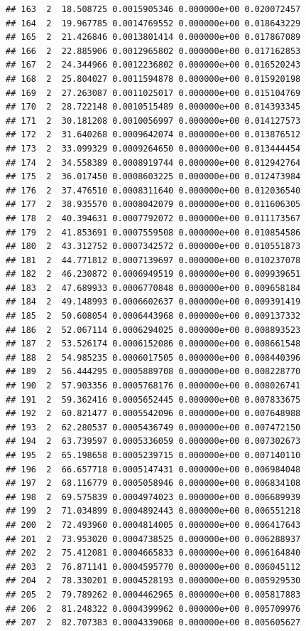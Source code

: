 \documentclass[article]{jss}\usepackage[]{graphicx}\usepackage[]{xcolor}
\makeatletter
\newenvironment{kframe}{%
 \def\at@end@of@kframe{}%
 \ifinner\ifhmode%
  \def\at@end@of@kframe{\end{minipage}}%
  \begin{minipage}{\columnwidth}%
 \fi\fi%
 \def\FrameCommand##1{\hskip\@totalleftmargin \hskip-\fboxsep
 \colorbox{shadecolor}{##1}\hskip-\fboxsep
     \hskip-\linewidth \hskip-\@totalleftmargin \hskip\columnwidth}%
 \MakeFramed {\advance\hsize-\width
   \@totalleftmargin\z@ \linewidth\hsize
   \@setminipage}}%
 {\par\unskip\endMakeFramed%
 \at@end@of@kframe}
\newenvironment{knitrout}{}{} %
\makeatother
\begin{document}
\begin{knitrout}
\begin{kframe}
\begin{verbatim}
## 163  2  18.508725 0.0015905346 0.000000e+00 0.020072457
## 164  2  19.967785 0.0014769552 0.000000e+00 0.018643229
## 165  2  21.426846 0.0013801414 0.000000e+00 0.017867089
## 166  2  22.885906 0.0012965802 0.000000e+00 0.017162853
## 167  2  24.344966 0.0012236802 0.000000e+00 0.016520243
## 168  2  25.804027 0.0011594878 0.000000e+00 0.015920198
## 169  2  27.263087 0.0011025017 0.000000e+00 0.015104769
## 170  2  28.722148 0.0010515489 0.000000e+00 0.014393345
## 171  2  30.181208 0.0010056997 0.000000e+00 0.014127573
## 172  2  31.640268 0.0009642074 0.000000e+00 0.013876512
## 173  2  33.099329 0.0009264650 0.000000e+00 0.013444454
## 174  2  34.558389 0.0008919744 0.000000e+00 0.012942764
## 175  2  36.017450 0.0008603225 0.000000e+00 0.012473984
## 176  2  37.476510 0.0008311640 0.000000e+00 0.012036540
## 177  2  38.935570 0.0008042079 0.000000e+00 0.011606305
## 178  2  40.394631 0.0007792072 0.000000e+00 0.011173567
## 179  2  41.853691 0.0007559508 0.000000e+00 0.010854586
## 180  2  43.312752 0.0007342572 0.000000e+00 0.010551873
## 181  2  44.771812 0.0007139697 0.000000e+00 0.010237078
## 182  2  46.230872 0.0006949519 0.000000e+00 0.009939651
## 183  2  47.689933 0.0006770848 0.000000e+00 0.009658184
## 184  2  49.148993 0.0006602637 0.000000e+00 0.009391419
## 185  2  50.608054 0.0006443968 0.000000e+00 0.009137332
## 186  2  52.067114 0.0006294025 0.000000e+00 0.008893523
## 187  2  53.526174 0.0006152086 0.000000e+00 0.008661548
## 188  2  54.985235 0.0006017505 0.000000e+00 0.008440396
## 189  2  56.444295 0.0005889708 0.000000e+00 0.008228770
## 190  2  57.903356 0.0005768176 0.000000e+00 0.008026741
## 191  2  59.362416 0.0005652445 0.000000e+00 0.007833675
## 192  2  60.821477 0.0005542096 0.000000e+00 0.007648988
## 193  2  62.280537 0.0005436749 0.000000e+00 0.007472150
## 194  2  63.739597 0.0005336059 0.000000e+00 0.007302673
## 195  2  65.198658 0.0005239715 0.000000e+00 0.007140110
## 196  2  66.657718 0.0005147431 0.000000e+00 0.006984048
## 197  2  68.116779 0.0005058946 0.000000e+00 0.006834108
## 198  2  69.575839 0.0004974023 0.000000e+00 0.006689939
## 199  2  71.034899 0.0004892443 0.000000e+00 0.006551218
## 200  2  72.493960 0.0004814005 0.000000e+00 0.006417643
## 201  2  73.953020 0.0004738525 0.000000e+00 0.006288937
## 202  2  75.412081 0.0004665833 0.000000e+00 0.006164840
## 203  2  76.871141 0.0004595770 0.000000e+00 0.006045112
## 204  2  78.330201 0.0004528193 0.000000e+00 0.005929530
## 205  2  79.789262 0.0004462965 0.000000e+00 0.005817883
## 206  2  81.248322 0.0004399962 0.000000e+00 0.005709976
## 207  2  82.707383 0.0004339068 0.000000e+00 0.005605627

\end{verbatim}
\end{kframe}
\end{knitrout}
\end{document}
